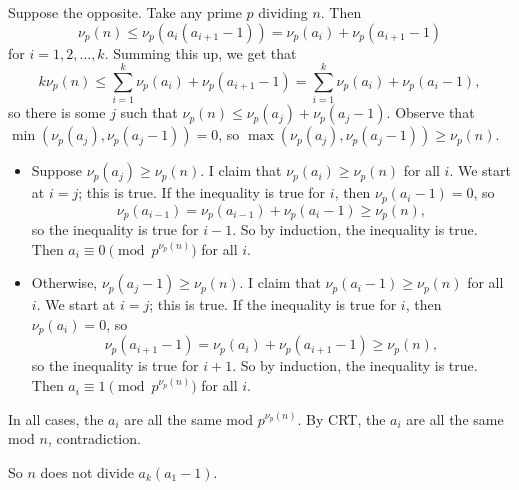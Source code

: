 Suppose the opposite. Take any prime $p$ dividing $n$. Then \[\nu_p\left(n\right)\leq\nu_p\left(a_i\left(a_{i+1}-1\right)\right)=\nu_p\left(a_i\right)+\nu_p\left(a_{i+1}-1\right)\] for $i=1,2,\ldots,k$. Summing this up, we get that \[k\nu_p\left(n\right)\leq\displaystyle\sum_{i=1}^k\nu_p\left(a_i\right)+\nu_p\left(a_{i+1}-1\right)=\displaystyle\sum_{i=1}^k\nu_p\left(a_i\right)+\nu_p\left(a_i-1\right),\] so there is some $j$ such that $\nu_p\left(n\right)\leq\nu_p\left(a_j\right)+\nu_p\left(a_j-1\right)$. Observe that $\min\left(\nu_p\left(a_j\right),\nu_p\left(a_j-1\right)\right)=0$, so $\max\left(\nu_p\left(a_j\right),\nu_p\left(a_j-1\right)\right)\geq\nu_p\left(n\right)$.

\begin{itemize}
	\item Suppose $\nu_p\left(a_j\right)\geq\nu_p\left(n\right)$. I claim that $\nu_p\left(a_i\right)\geq\nu_p\left(n\right)$ for all $i$. We start at $i=j$; this is true. If the inequality is true for $i$, then $\nu_p\left(a_i-1\right)=0$, so \[\nu_p\left(a_{i-1}\right)=\nu_p\left(a_{i-1}\right)+\nu_p\left(a_i-1\right)\geq\nu_p\left(n\right),\] so the inequality is true for $i-1$. So by induction, the inequality is true. Then $a_i\equiv0\pmod p^{\nu_p\left(n\right)}$ for all $i$.
	\item Otherwise, $\nu_p\left(a_j-1\right)\geq\nu_p\left(n\right)$. I claim that $\nu_p\left(a_i-1\right)\geq\nu_p\left(n\right)$ for all $i$. We start at $i=j$; this is true. If the inequality is true for $i$, then $\nu_p\left(a_i\right)=0$, so \[\nu_p\left(a_{i+1}-1\right)=\nu_p\left(a_i\right)+\nu_p\left(a_{i+1}-1\right)\geq\nu_p\left(n\right),\] so the inequality is true for $i+1$. So by induction, the inequality is true. Then $a_i\equiv1\pmod p^{\nu_p\left(n\right)}$ for all $i$.
\end{itemize}

In all cases, the $a_i$ are all the same mod $p^{\nu_p\left(n\right)}$. By CRT, the $a_i$ are all the same mod $n$, contradiction.

So $n$ does not divide $a_k\left(a_1-1\right)$.